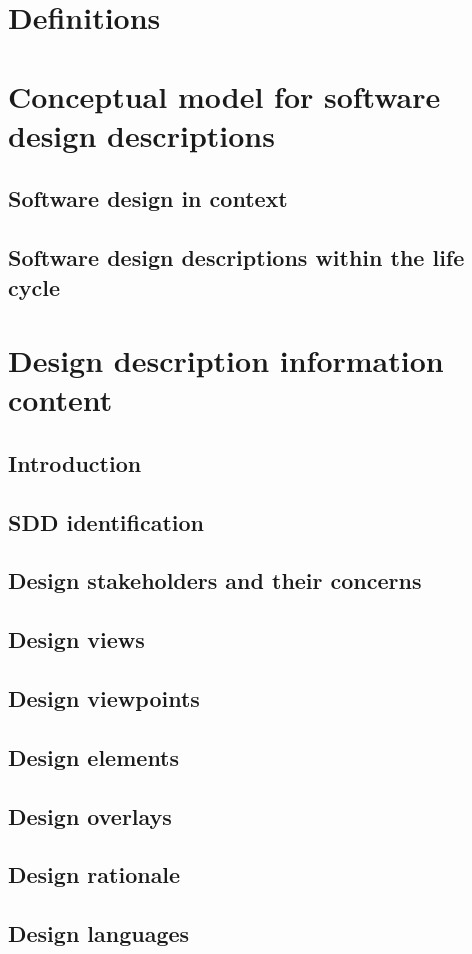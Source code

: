 \documentclass[letterpaper,10pt,draftclsnofoot,onecolumn]{IEEEtran}
\begin{document}
\begin{flushleft}
\section{Definitions}
\section{Conceptual model for software design descriptions }
\subsection{Software design in context}
\subsection{Software design descriptions within the life cycle}
\section{Design description information content}
\subsection{Introduction }
\subsection{SDD identification}
\subsection{Design stakeholders and their concerns}
\subsection{Design views}
\subsection{Design viewpoints }
\subsection{Design elements}
\subsection{Design overlays }
\subsection{Design rationale}
\subsection{Design languages}

\end{flushleft}
\end{document}
